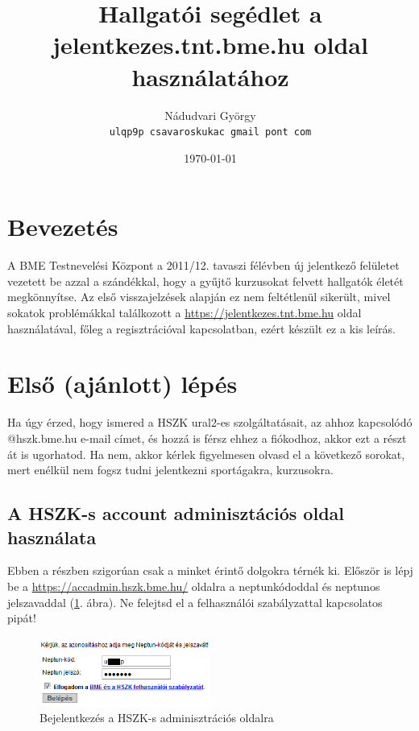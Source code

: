 \documentclass[a4paper,10pt,titlepage]{article}
\begin{document}


\begin{titlepage}
\title{Hallgatói segédlet a jelentkezes.tnt.bme.hu oldal használatához}
\author{Nádudvari György \\
\texttt{ulqp9p csavaroskukac gmail pont com}}
\date{\today}
\end{titlepage}
\maketitle

\section{Bevezetés}

A BME Testnevelési Központ a 2011/12. tavaszi félévben új jelentkező felületet vezetett be azzal a szándékkal, hogy a gyűjtő kurzusokat felvett hallgatók életét megkönnyítse. Az első visszajelzések alapján ez nem feltétlenül sikerült, mivel sokatok problémákkal találkozott a \href{https://jelentkezes.tnt.bme.hu}{https://jelentkezes.tnt.bme.hu} oldal használatával, főleg a regisztrációval kapcsolatban, ezért készült ez a kis leírás.

\section{Első (ajánlott) lépés}

Ha úgy érzed, hogy ismered a HSZK ural2-es szolgáltatásait, az ahhoz kapcsolódó @hszk.bme.hu e-mail címet, és hozzá is férsz ehhez a fiókodhoz, akkor ezt a részt át is ugorhatod. Ha nem, akkor kérlek figyelmesen olvasd el a következő sorokat, mert enélkül nem fogsz tudni jelentkezni sportágakra, kurzusokra.

\subsection{A HSZK-s account adminisztációs oldal használata}

Ebben a részben szigorúan csak a minket érintő dolgokra térnék ki. Először is lépj be a \href{https://accadmin.hszk.bme.hu/}{https://accadmin.hszk.bme.hu/} oldalra a neptunkódoddal és neptunos jelszavaddal (\ref{fig:hszk_acc_admin_login}. ábra). Ne felejtsd el a felhasználói szabályzattal kapcsolatos pipát!

\begin{figure}[h!]
\centering
\includegraphics[width=0.50\textwidth]{figures/hszk_acc_admin_login.png}
\caption{Bejelentkezés a HSZK-s adminisztrációs oldalra \label{fig:hszk_acc_admin_login}}
\end{figure}
\end{document}
